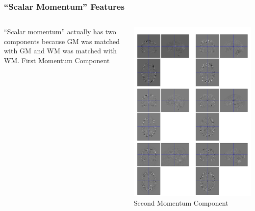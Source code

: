 \documentclass{beamer}
\begin{document}
\begin{frame}
\frametitle{``Scalar Momentum'' Features}
\begin{columns}[c]
``Scalar momentum'' actually has two components because GM was matched with GM and WM was matched with WM.
First Momentum Component

\includegraphics[width=1\textwidth]{resids1_ixi}
Second Momentum Component


\end{columns}
\end{frame}
\end{document}
